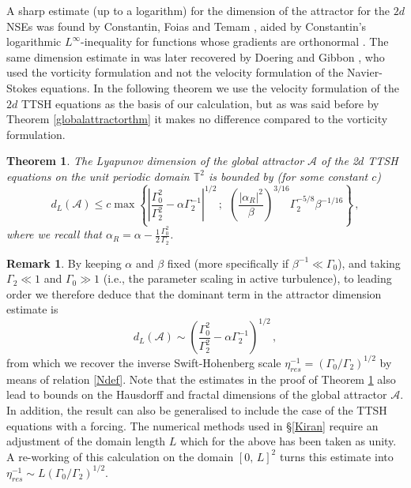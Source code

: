 \documentclass[11pt]{amsart}
\newcommand{\Rb}{\beta}
\newcommand{\Att}{\mathcal{A}}
\newcommand{\Gamzero}{\Gamma_{0}}
\newcommand{\Gamtwo}{\Gamma_{2}}
\newtheorem{theorem}[proposition]{Theorem}
\theoremstyle{definition}
\newtheorem{remark}[proposition]{Remark}
\numberwithin{equation}{section}
\numberwithin{equation}{section}
\begin{document}
A sharp estimate (up to a logarithm) for the dimension of the attractor for the $2d$ NSEs was found by Constantin, Foias and Temam \cite{CFT1988}, aided by Constantin's logarithmic $L^{\infty}$-inequality for functions whose gradients are orthonormal \cite{Constantin1987}. The same dimension estimate in \cite{CFT1988} was later recovered by Doering and Gibbon \cite{DG1991}, who used the vorticity formulation and not the velocity formulation of the Navier-Stokes equations. In the following theorem we use the velocity formulation of the $2d$ TTSH equations as the basis of our calculation, but as was said before by Theorem \ref{globalattractorthm} it makes no difference compared to the vorticity formulation.
\begin{theorem}\label{2dattthm}
The Lyapunov dimension of the global attractor $\mathcal{A}$ of the 2$d$ TTSH equations on the unit periodic domain $\mathbb{T}^2$ is bounded by (for some constant $c$)
\begin{equation*}
d_L (\Att) \leq c\max \left\{\left\lvert\frac{\Gamzero^2}{\Gamtwo^2} - \alpha \Gamtwo^{-1}\right\rvert^{1/2}\,;
~~\left(\frac{|\alpha_{R}|^2}{\Rb}\right)^{3/16}\Gamtwo^{-5/8}\Rb^{-1/16}
\right\}\,,
\end{equation*}
where we recall that $\alpha_{R} = \alpha - \frac{1}{2} \frac{\Gamzero^2}{\Gamtwo}$.
\end{theorem}
\par\vspace{0mm}\noindent
\begin{remark} \label{2Dremark}
By keeping $\alpha$ and $\Rb$ fixed (more specifically if $\Rb^{-1} \ll \Gamzero$), and taking $\Gamtwo \ll 1$ and $\Gamzero \gg 1$ (i.e., the parameter scaling in active turbulence), to leading order we therefore deduce that the dominant term in the attractor dimension estimate is
\begin{equation}
d_L (\Att) \sim \left(\frac{\Gamzero^2}{\Gamtwo^2} - \alpha \Gamtwo^{-1}\right)^{1/2}\,,
\end{equation}
from which we recover the inverse Swift-Hohenberg scale $\eta_{res}^{-1} = (\Gamzero/\Gamtwo)^{1/2}$ by means of relation \eqref{Ndef}. Note that the estimates in the proof of Theorem \ref{2dattthm} also lead to bounds on the Hausdorff and fractal dimensions of the global attractor $\Att$. In addition, the result can also be generalised to include the case of the TTSH equations with a forcing. The numerical methods used in \S\ref{Kiran} require an adjustment of the domain length $L$ which for the above has been taken as unity. A re-working of this calculation on the domain $[0,\,L]^2$ turns this estimate into $\eta_{res}^{-1}\sim L(\Gamzero/\Gamtwo)^{1/2}$.
\end{remark}
\end{document}
